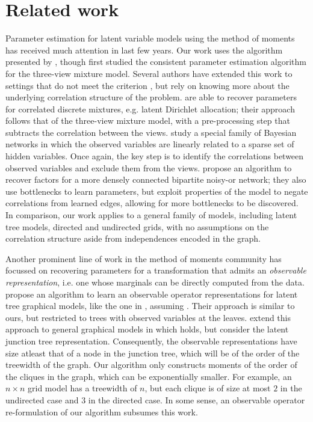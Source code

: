 \section{Related work}
\label{sec:related}

Parameter estimation for latent variable models using the method of
  moments has received much attention in last few years.
Our work uses the \TensorFactorize algorithm presented by
  \citet{anandkumar13tensor}, though \citet{anandkumar12moments} first
  studied the consistent parameter estimation algorithm for the
  three-view mixture model.
Several authors have extended this work to settings that do not meet the
  criterion , but rely on knowing more about
  the underlying correlation structure of the problem.
\citet{anandkumar12lda} are able to recover parameters for correlated
  discrete mixtures, e.g. latent Dirichlet allocation; their approach
  follows that of the three-view mixture model, with a pre-processing step
  that subtracts the correlation between the views.
\citet{anandkumar12linear} study a special family of Bayesian networks
  in which the observed variables are linearly related to a sparse set of
  hidden variables. Once again, the key step is to identify the
  correlations between observed variables and exclude them from the views.
\citet{halpern13noisyor} propose an algorithm to recover factors for
  a more densely connected bipartite noisy-or network; they also use
  bottlenecks to learn parameters, but exploit properties of the model
  to negate correlations from learned edges, allowing for more
  bottlenecks to be discovered. 
In comparison, our work applies to a general family of models, including
  latent tree models, directed and undirected grids, with no assumptions
  on the correlation structure aside from independences encoded in the
  graph. 

Another prominent line of work in the method of moments community has
  focussed on recovering parameters for a transformation that admits an {\em observable
  representation}, i.e. one whose marginals can be directly computed from the data.
\citet{song2011spectral} propose an algorithm to learn an observable
  operator representations for latent tree graphical models, like the
  one in , assuming . 
Their approach is similar to ours, but restricted to trees with observed
  variables at the leaves.
\citet{parikh12spectral} extend this approach to general graphical
  models in which  holds, but consider the latent
  junction tree representation. 
Consequently, the observable representations have size atleast that of
  a node in the junction tree, which will be of the order of the treewidth
  of the graph. 
Our algorithm only constructs moments of the order of the cliques in the
  graph, which can be exponentially smaller. 
For example, an $n\times n$ grid model has a treewidth of $n$, but each
  clique is of size at most $2$ in the undirected case and $3$ in the
  directed case.
In some sense, an observable operator re-formulation of our algorithm
  subsumes this work.

